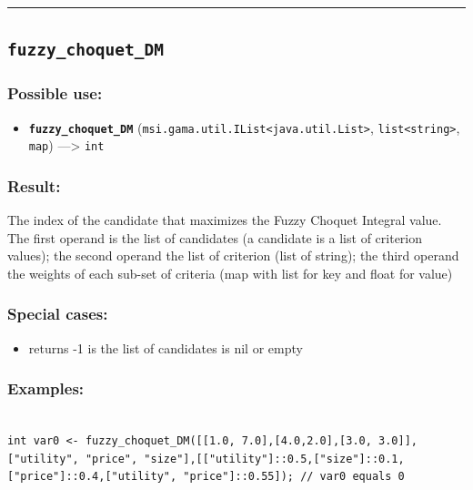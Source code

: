 \documentclass[]{book}
\providecommand{\tightlist}{%
  \setlength{\itemsep}{0pt}\setlength{\parskip}{0pt}}
\theoremstyle{definition}
\theoremstyle{definition}
\theoremstyle{definition}
\theoremstyle{remark}
\begin{document}
\begin{center}\rule{0.5\linewidth}{\linethickness}\end{center}

\subsection{\texorpdfstring{\texttt{fuzzy\_choquet\_DM}}{fuzzy\_choquet\_DM}}\label{fuzzy_choquet_dm}

\subsubsection{Possible use:}\label{possible-use-175}

\begin{itemize}
\tightlist
\item
  \textbf{\texttt{fuzzy\_choquet\_DM}}
  (\texttt{msi.gama.util.IList\textless{}java.util.List\textgreater{}},
  \texttt{list\textless{}string\textgreater{}}, \texttt{map})
  ---\textgreater{} \texttt{int}
\end{itemize}

\subsubsection{Result:}\label{result-169}

The index of the candidate that maximizes the Fuzzy Choquet Integral
value. The first operand is the list of candidates (a candidate is a
list of criterion values); the second operand the list of criterion
(list of string); the third operand the weights of each sub-set of
criteria (map with list for key and float for value)

\subsubsection{Special cases:}\label{special-cases-65}

\begin{itemize}
\tightlist
\item
  returns -1 is the list of candidates is nil or empty
\end{itemize}

\subsubsection{Examples:}\label{examples-130}

\begin{verbatim}
 
int var0 <- fuzzy_choquet_DM([[1.0, 7.0],[4.0,2.0],[3.0, 3.0]], ["utility", "price", "size"],[["utility"]::0.5,["size"]::0.1,["price"]::0.4,["utility", "price"]::0.55]); // var0 equals 0
\end{verbatim}
\end{document}
